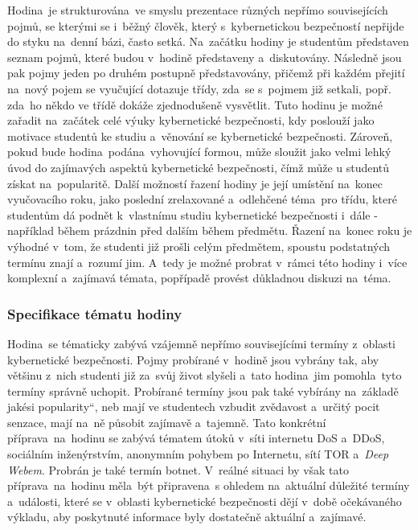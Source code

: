 \documentclass[a4paper, 12pt]{article}
\providecommand{\uv}[1]{\quotedblbase #1\textquotedblleft}
\begin{document}
Hodina~je strukturována~ve smyslu prezentace různých nepřímo souvisejících pojmů, se kterými se i~běžný člověk, který s~kybernetickou bezpečností nepřijde do styku na~denní bázi, často setká. Na~začátku hodiny je studentům představen seznam pojmů, které budou v~hodině představeny a~diskutovány. Následně jsou pak pojmy jeden po druhém postupně představovány, přičemž při každém přejití na~nový pojem se vyučující dotazuje třídy, zda~se s~pojmem již setkali, popř. zda~ho někdo ve třídě dokáže zjednodušeně vysvětlit. Tuto hodinu je možné zařadit na~začátek celé výuky kybernetické bezpečnosti, kdy poslouží jako motivace studentů ke studiu a~věnování se kybernetické bezpečnosti. Zároveň, pokud bude hodina~podána~vyhovující formou, může sloužit jako velmi lehký úvod do zajímavých aspektů kybernetické bezpečnosti, čímž může u studentů získat na~popularitě. Další možností řazení hodiny je její umístění na~konec vyučovacího roku, jako poslední zrelaxované a~odlehčené téma~pro třídu, které studentům dá podnět k~vlastnímu studiu kybernetické bezpečnosti i~dále - například během prázdnin před dalším během předmětu. Řazení na~konec roku je výhodné v~tom, že studenti již prošli celým předmětem, spoustu podstatných termínu znají a~rozumí jim. A~tedy je možné probrat v~rámci této hodiny i~více komplexní a~zajímavá témata, popřípadě provést důkladnou diskuzi na~téma.

\subsubsection{Specifikace tématu hodiny} 
Hodina~se tématicky zabývá vzájemně nepřímo souvisejícími termíny z~oblasti kybernetické bezpečnosti. Pojmy probírané v~hodině jsou vybrány tak, aby většinu z~nich studenti již za~svůj život slyšeli a~tato hodina~jim pomohla~tyto termíny správně uchopit. Probírané termíny jsou pak také vybírány na~základě jakési \uv{popularity}, neb mají ve studentech vzbudit zvědavost a~určitý pocit senzace, mají na~ně působit zajímavě a~tajemně. Tato konkrétní příprava~na~hodinu se zabývá tématem útoků v~síti internetu DoS a~DDoS, sociálním inženýrstvím, anonymním pohybem po Internetu, sítí TOR a~\textit{Deep Webem}. Probrán je také termín botnet. V~reálné situaci by však tato příprava~na~hodinu měla~být připravena~s ohledem na~aktuální důležité termíny a~události, které se v~oblasti kybernetické bezpečnosti dějí v~době očekávaného výkladu, aby poskytnuté informace byly dostatečně aktuální a~zajímavé.
\end{document}
